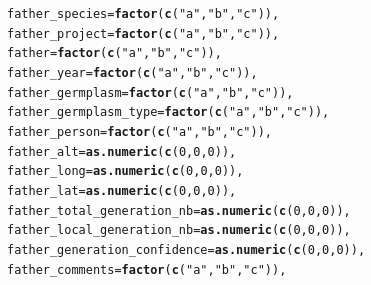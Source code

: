 \documentclass{article}\usepackage[]{graphicx}\usepackage[]{color}
\makeatletter
\newcommand{\hlnum}[1]{\textcolor[rgb]{0.686,0.059,0.569}{#1}}%
\newcommand{\hlstr}[1]{\textcolor[rgb]{0.192,0.494,0.8}{#1}}%
\newcommand{\hlstd}[1]{\textcolor[rgb]{0.345,0.345,0.345}{#1}}%
\newcommand{\hlkwc}[1]{\textcolor[rgb]{0.333,0.667,0.333}{#1}}%
\newcommand{\hlkwd}[1]{\textcolor[rgb]{0.737,0.353,0.396}{\textbf{#1}}}%
\newenvironment{kframe}{%
 \def\at@end@of@kframe{}%
 \ifinner\ifhmode%
  \def\at@end@of@kframe{\end{minipage}}%
  \begin{minipage}{\columnwidth}%
 \fi\fi%
 \def\FrameCommand##1{\hskip\@totalleftmargin \hskip-\fboxsep
 \colorbox{shadecolor}{##1}\hskip-\fboxsep
     \hskip-\linewidth \hskip-\@totalleftmargin \hskip\columnwidth}%
 \MakeFramed {\advance\hsize-\width
   \@totalleftmargin\z@ \linewidth\hsize
   \@setminipage}}%
 {\par\unskip\endMakeFramed%
 \at@end@of@kframe}
\newenvironment{knitrout}{}{} %
\makeatother
\begin{document}
\begin{appendices}
\begin{knitrout}
\begin{kframe}
\begin{alltt}
        \hlkwc{father_species} \hlstd{=} \hlkwd{factor}\hlstd{(}\hlkwd{c}\hlstd{(}\hlstr{"a"}\hlstd{,} \hlstr{"b"}\hlstd{,} \hlstr{"c"}\hlstd{)),}
        \hlkwc{father_project} \hlstd{=} \hlkwd{factor}\hlstd{(}\hlkwd{c}\hlstd{(}\hlstr{"a"}\hlstd{,} \hlstr{"b"}\hlstd{,} \hlstr{"c"}\hlstd{)),}
        \hlkwc{father} \hlstd{=} \hlkwd{factor}\hlstd{(}\hlkwd{c}\hlstd{(}\hlstr{"a"}\hlstd{,} \hlstr{"b"}\hlstd{,} \hlstr{"c"}\hlstd{)),}
        \hlkwc{father_year} \hlstd{=} \hlkwd{factor}\hlstd{(}\hlkwd{c}\hlstd{(}\hlstr{"a"}\hlstd{,} \hlstr{"b"}\hlstd{,} \hlstr{"c"}\hlstd{)),}
        \hlkwc{father_germplasm} \hlstd{=} \hlkwd{factor}\hlstd{(}\hlkwd{c}\hlstd{(}\hlstr{"a"}\hlstd{,} \hlstr{"b"}\hlstd{,} \hlstr{"c"}\hlstd{)),}
        \hlkwc{father_germplasm_type} \hlstd{=} \hlkwd{factor}\hlstd{(}\hlkwd{c}\hlstd{(}\hlstr{"a"}\hlstd{,} \hlstr{"b"}\hlstd{,} \hlstr{"c"}\hlstd{)),}
        \hlkwc{father_person} \hlstd{=} \hlkwd{factor}\hlstd{(}\hlkwd{c}\hlstd{(}\hlstr{"a"}\hlstd{,} \hlstr{"b"}\hlstd{,} \hlstr{"c"}\hlstd{)),}
        \hlkwc{father_alt} \hlstd{=} \hlkwd{as.numeric}\hlstd{(}\hlkwd{c}\hlstd{(}\hlnum{0}\hlstd{,} \hlnum{0}\hlstd{,} \hlnum{0}\hlstd{)),}
        \hlkwc{father_long} \hlstd{=} \hlkwd{as.numeric}\hlstd{(}\hlkwd{c}\hlstd{(}\hlnum{0}\hlstd{,} \hlnum{0}\hlstd{,} \hlnum{0}\hlstd{)),}
        \hlkwc{father_lat} \hlstd{=} \hlkwd{as.numeric}\hlstd{(}\hlkwd{c}\hlstd{(}\hlnum{0}\hlstd{,} \hlnum{0}\hlstd{,} \hlnum{0}\hlstd{)),}
        \hlkwc{father_total_generation_nb} \hlstd{=} \hlkwd{as.numeric}\hlstd{(}\hlkwd{c}\hlstd{(}\hlnum{0}\hlstd{,} \hlnum{0}\hlstd{,} \hlnum{0}\hlstd{)),}
        \hlkwc{father_local_generation_nb} \hlstd{=} \hlkwd{as.numeric}\hlstd{(}\hlkwd{c}\hlstd{(}\hlnum{0}\hlstd{,} \hlnum{0}\hlstd{,} \hlnum{0}\hlstd{)),}
        \hlkwc{father_generation_confidence} \hlstd{=} \hlkwd{as.numeric}\hlstd{(}\hlkwd{c}\hlstd{(}\hlnum{0}\hlstd{,} \hlnum{0}\hlstd{,} \hlnum{0}\hlstd{)),}
        \hlkwc{father_comments} \hlstd{=} \hlkwd{factor}\hlstd{(}\hlkwd{c}\hlstd{(}\hlstr{"a"}\hlstd{,} \hlstr{"b"}\hlstd{,} \hlstr{"c"}\hlstd{)),}


\end{alltt}
\end{kframe}
\end{knitrout}
\end{appendices}
\end{document}
